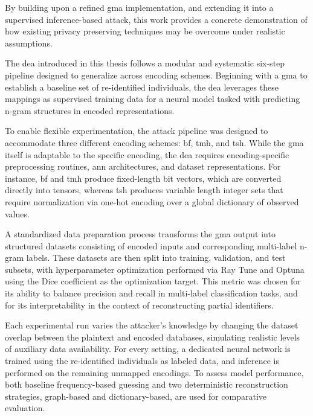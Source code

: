 By building upon a refined \ac{gma} implementation, and extending it into a supervised inference-based attack, this work provides a concrete demonstration of how existing privacy preserving techniques may be overcome under realistic assumptions.

The \ac{dea} introduced in this thesis follows a modular and systematic six-step pipeline designed to generalize across encoding schemes.
Beginning with a \ac{gma} to establish a baseline set of re-identified individuals, the \ac{dea} leverages these mappings as supervised training data for a neural model tasked with predicting n-gram structures in encoded representations.

To enable flexible experimentation, the attack pipeline was designed to accommodate three different encoding schemes: \ac{bf}, \ac{tmh}, and \ac{tsh}.
While the \ac{gma} itself is adaptable to the specific encoding, the \ac{dea} requires encoding-specific preprocessing routines, \ac{ann} architectures, and dataset representations.
For instance, \ac{bf} and \ac{tmh} produce fixed-length bit vectors, which are converted directly into tensors, whereas \ac{tsh} produces variable length integer sets that require normalization via one-hot encoding over a global dictionary of observed values.

A standardized data preparation process transforms the \ac{gma} output into structured datasets consisting of encoded inputs and corresponding multi-label n-gram labels.
These datasets are then split into training, validation, and test subsets, with hyperparameter optimization performed via Ray Tune and Optuna using the Dice coefficient as the optimization target.
This metric was chosen for its ability to balance precision and recall in multi-label classification tasks, and for its interpretability in the context of reconstructing partial identifiers.

Each experimental run varies the attacker’s knowledge by changing the dataset overlap between the plaintext and encoded databases, simulating realistic levels of auxiliary data availability.
For every setting, a dedicated neural network is trained using the re-identified individuals as labeled data, and inference is performed on the remaining unmapped encodings.
To assess model performance, both baseline frequency-based guessing and two deterministic reconstruction strategies, graph-based and dictionary-based, are used for comparative evaluation.

